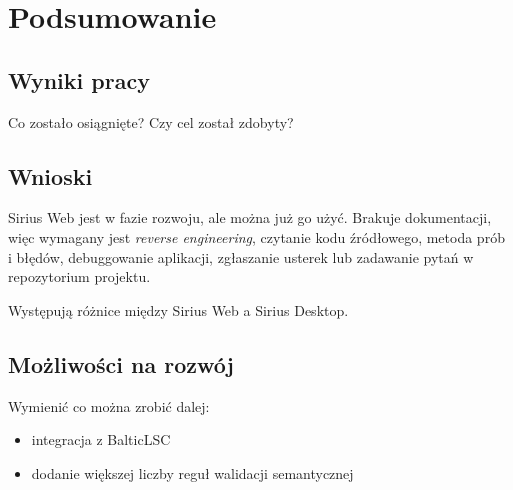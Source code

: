 \chapter{Podsumowanie}

\section{Wyniki pracy}

Co zostało osiągnięte? Czy cel został zdobyty?

\section{Wnioski}

Sirius Web jest w fazie rozwoju, ale można już go użyć. Brakuje dokumentacji,
więc wymagany jest \textit{reverse engineering}, czytanie kodu źródłowego,
metoda prób i błędów, debuggowanie aplikacji, zgłaszanie usterek lub zadawanie
pytań w repozytorium projektu.

Występują różnice między Sirius Web a Sirius Desktop.

\section{Możliwości na rozwój}

Wymienić co można zrobić dalej:

\begin{itemize}
	\item integracja z BalticLSC
	\item dodanie większej liczby reguł walidacji semantycznej
\end{itemize}
